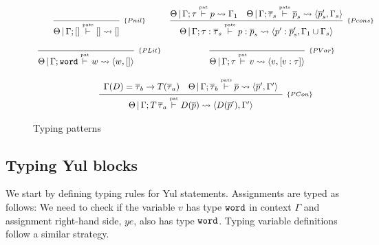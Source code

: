 \documentclass[a4paper, 11pt]{article}
\theoremstyle{definition}
\begin{document}
\begin{figure}[H]
  \[
    \begin{array}{cc}
      \infer[_{\{Pnil\}}]
            {\Theta\,|\,\Gamma ; [] \typing{pats} [] \leadsto []}
            {}
      &
      \infer[_{\{Pcons\}}]
            {\Theta\,|\,\Gamma ; \tau : \overline{\tau}_s \typing{pats} p : \overline{p}_s \leadsto  \langle p' : \overline{p}'_s, \Gamma_1 \cup \Gamma_s \rangle}
            {\Theta\,|\,\Gamma ; \tau \typing{pat} p \leadsto \Gamma_1
             &
             \Theta\,|\,\Gamma ; \overline{\tau}_s \typing{pats} \overline{p}_s \leadsto \langle \overline{p}'_s, \Gamma_s \rangle}
      \\ \\
        \infer[_{\{PLit\}}]
              {\Theta\,|\,\Gamma ; \word \typing{pat} w \leadsto \langle w, []\rangle}
              {}
      &
        \infer[_{\{PVar\}}]
              {\Theta\,|\,\Gamma ; \tau \typing{pat} v \leadsto \langle v, [v : \tau] \rangle}
              {}
      \\ \\
      \multicolumn{2}{c}{
        \infer[_{\{PCon\}}]
              {\Theta\,|\,\Gamma ; T\,\overline{\tau}_a \typing{pat} D(\overline{p}) \leadsto \langle D(\overline{p}'), \Gamma' \rangle}
              {\begin{array}{cc}
                  \Gamma(D) = \overline{\tau}_b \to T (\overline{\tau}_a)
                  &
                  \Theta\,|\,\Gamma ; \overline{\tau}_b \typing{pats} \overline{p} \leadsto \langle \overline{p}', \Gamma'\rangle
               \end{array}}
      }
    \end{array}
  \]
  \centering
  \caption{Typing patterns}
  \label{fig:patterns}
\end{figure}

\subsection{Typing Yul blocks}

We start by defining typing rules for Yul statements.
Assignments are typed as follows:
We need to check if the variable $v$ has type $\mathtt{word}$ in context $\Gamma$ and
assignment right-hand side, $ye$, also has type $\mathtt{word}$. Typing variable definitions
follow a similar strategy.
\end{document}
